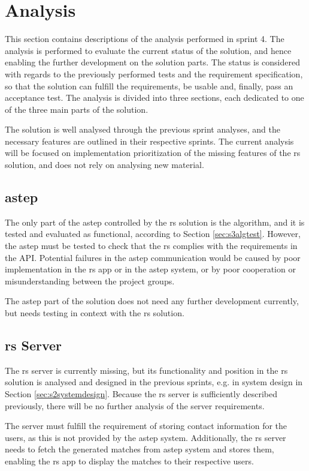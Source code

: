 \section{Analysis}
This section contains descriptions of the analysis performed in sprint 4.
The analysis is performed to evaluate the current status of the solution, and hence enabling the further development on the solution parts.
The status is considered with regards to the previously performed tests and the requirement specification, so that the solution can fulfill the requirements, be usable and, finally, pass an acceptance test.
The analysis is divided into three sections, each dedicated to one of the three main parts of the solution.

The solution is well analysed through the previous sprint analyses, and the necessary features are outlined in their respective sprints.
The current analysis will be focused on implementation prioritization of the missing features of the \gls{rs} solution, and does not rely on analysing new material.


\subsection{\gls{astep}}
The only part of the \gls{astep} controlled by the \gls{rs} solution is the algorithm, and it is tested and evaluated as functional, according to Section \ref{sec:s3algtest}. However, the \gls{astep} must be tested to check that the \gls{rs} complies with the requirements in the API.
Potential failures in the \gls{astep} communication would be caused by poor implementation in the \gls{rs} app or in the \gls{astep} system, or by poor cooperation or misunderstanding between the project groups.

The \gls{astep} part of the solution does not need any further development currently, but needs testing in context with the \gls{rs} solution.

\subsection{\gls{rs} Server}
The \gls{rs} server is currently missing, but its functionality and position in the \gls{rs} solution is analysed and designed in the previous sprints, e.g. in system design in Section \ref{sec:s2systemdesign}. Because the \gls{rs} server is sufficiently described previously, there will be no further analysis of the server requirements.

The server must fulfill the requirement of storing contact information for the users, as this is not provided by the \gls{astep} system.
Additionally, the \gls{rs} server needs to fetch the generated matches from \gls{astep} system and stores them, enabling the \gls{rs} app to display the matches to their respective users.


